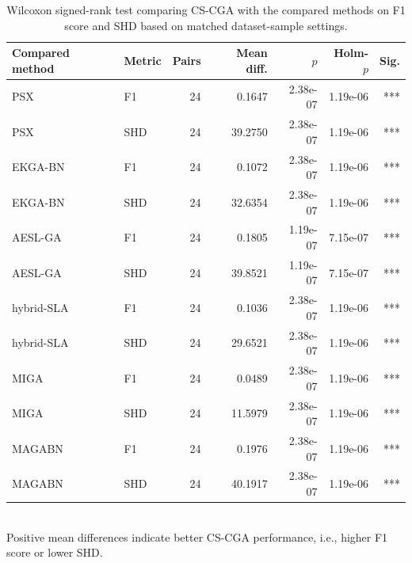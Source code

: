 ﻿\begin{table}[htbp]
\centering
\caption{Wilcoxon signed-rank test comparing CS-CGA with the compared methods on F1 score and SHD based on matched dataset-sample settings.}
\label{tab:wilcoxon_test}
\begin{tabular}{llrrrrr}
\toprule
Compared method & Metric & Pairs & Mean diff. & $p$ & Holm-$p$ & Sig. \\
\midrule
PSX & F1 & 24 & 0.1647 & 2.38e-07 & 1.19e-06 & *** \\
PSX & SHD & 24 & 39.2750 & 2.38e-07 & 1.19e-06 & *** \\
EKGA-BN & F1 & 24 & 0.1072 & 2.38e-07 & 1.19e-06 & *** \\
EKGA-BN & SHD & 24 & 32.6354 & 2.38e-07 & 1.19e-06 & *** \\
AESL-GA & F1 & 24 & 0.1805 & 1.19e-07 & 7.15e-07 & *** \\
AESL-GA & SHD & 24 & 39.8521 & 1.19e-07 & 7.15e-07 & *** \\
hybrid-SLA & F1 & 24 & 0.1036 & 2.38e-07 & 1.19e-06 & *** \\
hybrid-SLA & SHD & 24 & 29.6521 & 2.38e-07 & 1.19e-06 & *** \\
MIGA & F1 & 24 & 0.0489 & 2.38e-07 & 1.19e-06 & *** \\
MIGA & SHD & 24 & 11.5979 & 2.38e-07 & 1.19e-06 & *** \\
MAGABN & F1 & 24 & 0.1976 & 2.38e-07 & 1.19e-06 & *** \\
MAGABN & SHD & 24 & 40.1917 & 2.38e-07 & 1.19e-06 & *** \\
\bottomrule
\end{tabular}
\\
\footnotesize{Positive mean differences indicate better CS-CGA performance, i.e., higher F1 score or lower SHD.}
\end{table}
